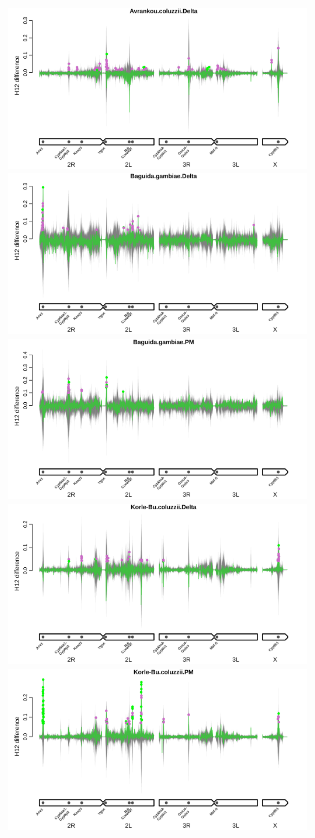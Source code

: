 \documentclass[a4paper,12pt]{article}
\begin{document}
\clearpage

\begin{figure}[h]
	\includegraphics*[width = 7.9cm]{../../randomisations/H12/Avrankou.coluzzii.Delta_peak_filter_plot.png}
	\vskip 0.4cm
	\includegraphics*[width = 7.9cm]{../../randomisations/H12/Baguida.gambiae.Delta_peak_filter_plot.png}
	\includegraphics*[width = 7.9cm]{../../randomisations/H12/Baguida.gambiae.PM_peak_filter_plot.png}
	\vskip 0.4cm
	\includegraphics*[width = 7.9cm]{../../randomisations/H12/Korle-Bu.coluzzii.Delta_peak_filter_plot.png}
	\includegraphics*[width = 7.9cm]{../../randomisations/H12/Korle-Bu.coluzzii.PM_peak_filter_plot.png}

\end{figure}
\end{document}
